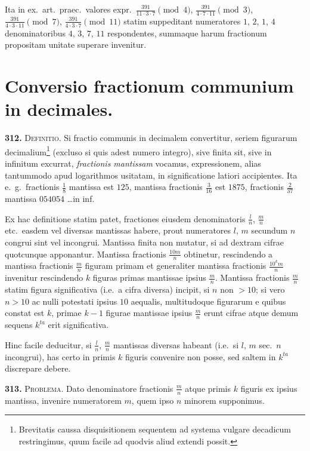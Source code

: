 \documentclass[12pt,a4paper]{article}
\theoremstyle{plain}
\theoremstyle{definition}
\theoremstyle{remark}
\begin{document}
Ita in ex.~art.~praec.~valores expr.~$\frac{391}{11 \cdot 3 \cdot 7} \pmod{4}$, $\frac{391}{4 \cdot 7 \cdot 11} \pmod{3}$, $\frac{391}{4 \cdot 3 \cdot 11} \pmod{7}$, $\frac{391}{4 \cdot 3 \cdot 7} \pmod{11}$ statim suppeditant numeratores $1$, $2$, $1$, $4$ denominatoribus $4$, $3$, $7$, $11$ respondentes, summaque harum fractionum propositam unitate superare invenitur.

\section*{Conversio fractionum communium in decimales.}

\textbf{312.} \textsc{Definitio.} Si fractio communis in decimalem convertitur, seriem figurarum decimalium\footnote{Brevitatis caussa disquisitionem sequentem ad systema vulgare decadicum restringimus, quum facile ad quodvis aliud extendi possit.} (excluso si quis adest numero integro), sive finita sit, sive in infinitum excurrat, \textit{fractionis mantissam} vocamus, expressionem, alias tantummodo apud logarithmos usitatam, in significatione latiori accipientes. Ita e.~g.~fractionis $\frac{1}{8}$ mantissa est $125$, mantissa fractionis $\frac{3}{16}$ est $1875$, fractionis $\frac{2}{37}$ mantissa $054054$ \ldots in inf.

Ex hac definitione statim patet, fractiones eiusdem denominatoris $\frac{l}{n}$, $\frac{m}{n}$ etc.~easdem vel diversas mantissas habere, prout numeratores $l$, $m$ secundum $n$ congrui sint vel incongrui. Mantissa finita non mutatur, si ad dextram cifrae quotcunque apponantur. Mantissa fractionis $\frac{10m}{n}$ obtinetur, rescindendo a mantissa fractionis $\frac{m}{n}$ figuram primam et generaliter mantissa fractionis $\frac{10^k m}{n}$ invenitur rescindendo $k$ figuras primas mantissae ipsius $\frac{m}{n}$. Mantissa fractionis $\frac{m}{n}$ statim figura significativa (i.e.~a cifra diversa) incipit, si $n$ non $> 10$; si vero $n > 10$ ac nulli potestati ipsius $10$ aequalis, multitudoque figurarum e quibus constat est $k$, primae $k-1$ figurae mantissae ipsius $\frac{m}{n}$ erunt cifrae atque demum sequens $k^{ta}$ erit significativa.

Hinc facile deducitur, si $\frac{l}{n}$, $\frac{m}{n}$ mantissas diversas habeant (i.e.~si $l$, $m$ sec.~$n$ incongrui), has certo in primis $k$ figuris convenire non posse, sed saltem in $k^{ta}$ discrepare debere.

\textbf{313.} \textsc{Problema.} Dato denominatore fractionis $\frac{m}{n}$ atque primis $k$ figuris ex ipsius mantissa, invenire numeratorem $m$, quem ipso $n$ minorem supponimus.
\end{document}
